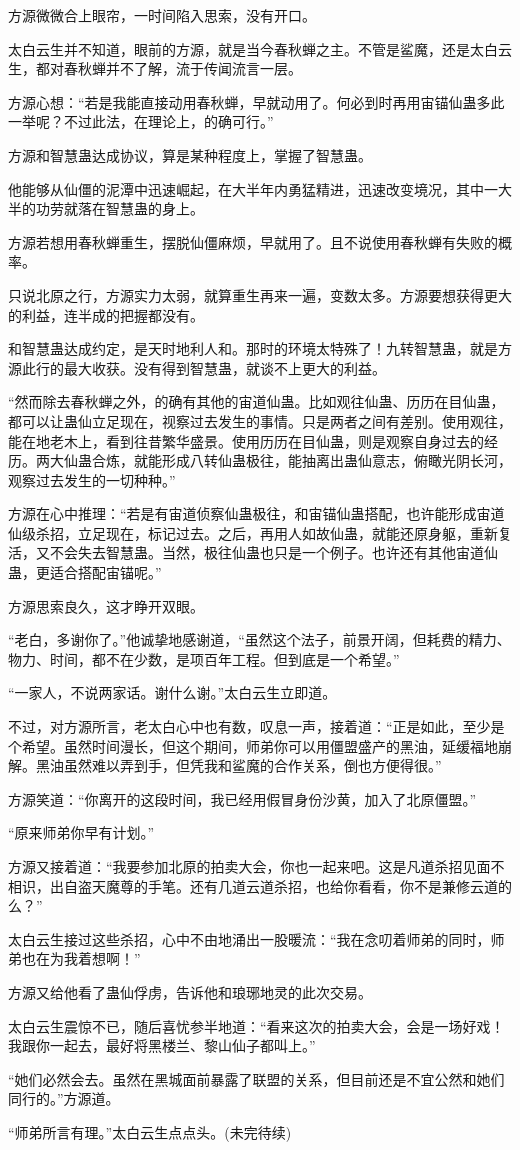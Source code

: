 \begin{this_body}
方源微微合上眼帘，一时间陷入思索，没有开口。

太白云生并不知道，眼前的方源，就是当今春秋蝉之主。不管是鲨魔，还是太白云生，都对春秋蝉并不了解，流于传闻流言一层。

方源心想：“若是我能直接动用春秋蝉，早就动用了。何必到时再用宙锚仙蛊多此一举呢？不过此法，在理论上，的确可行。”

方源和智慧蛊达成协议，算是某种程度上，掌握了智慧蛊。

他能够从仙僵的泥潭中迅速崛起，在大半年内勇猛精进，迅速改变境况，其中一大半的功劳就落在智慧蛊的身上。

方源若想用春秋蝉重生，摆脱仙僵麻烦，早就用了。且不说使用春秋蝉有失败的概率。

只说北原之行，方源实力太弱，就算重生再来一遍，变数太多。方源要想获得更大的利益，连半成的把握都没有。

和智慧蛊达成约定，是天时地利人和。那时的环境太特殊了！九转智慧蛊，就是方源此行的最大收获。没有得到智慧蛊，就谈不上更大的利益。

“然而除去春秋蝉之外，的确有其他的宙道仙蛊。比如观往仙蛊、历历在目仙蛊，都可以让蛊仙立足现在，视察过去发生的事情。只是两者之间有差别。使用观往，能在地老木上，看到往昔繁华盛景。使用历历在目仙蛊，则是观察自身过去的经历。两大仙蛊合炼，就能形成八转仙蛊极往，能抽离出蛊仙意志，俯瞰光阴长河，观察过去发生的一切种种。”

方源在心中推理：“若是有宙道侦察仙蛊极往，和宙锚仙蛊搭配，也许能形成宙道仙级杀招，立足现在，标记过去。之后，再用人如故仙蛊，就能还原身躯，重新复活，又不会失去智慧蛊。当然，极往仙蛊也只是一个例子。也许还有其他宙道仙蛊，更适合搭配宙锚呢。”

方源思索良久，这才睁开双眼。

“老白，多谢你了。”他诚挚地感谢道，“虽然这个法子，前景开阔，但耗费的精力、物力、时间，都不在少数，是项百年工程。但到底是一个希望。”

“一家人，不说两家话。谢什么谢。”太白云生立即道。

不过，对方源所言，老太白心中也有数，叹息一声，接着道：“正是如此，至少是个希望。虽然时间漫长，但这个期间，师弟你可以用僵盟盛产的黑油，延缓福地崩解。黑油虽然难以弄到手，但凭我和鲨魔的合作关系，倒也方便得很。”

方源笑道：“你离开的这段时间，我已经用假冒身份沙黄，加入了北原僵盟。”

“原来师弟你早有计划。”

方源又接着道：“我要参加北原的拍卖大会，你也一起来吧。这是凡道杀招见面不相识，出自盗天魔尊的手笔。还有几道云道杀招，也给你看看，你不是兼修云道的么？”

太白云生接过这些杀招，心中不由地涌出一股暖流：“我在念叨着师弟的同时，师弟也在为我着想啊！”

方源又给他看了蛊仙俘虏，告诉他和琅琊地灵的此次交易。

太白云生震惊不已，随后喜忧参半地道：“看来这次的拍卖大会，会是一场好戏！我跟你一起去，最好将黑楼兰、黎山仙子都叫上。”

“她们必然会去。虽然在黑城面前暴露了联盟的关系，但目前还是不宜公然和她们同行的。”方源道。

“师弟所言有理。”太白云生点点头。(未完待续)

\end{this_body}

